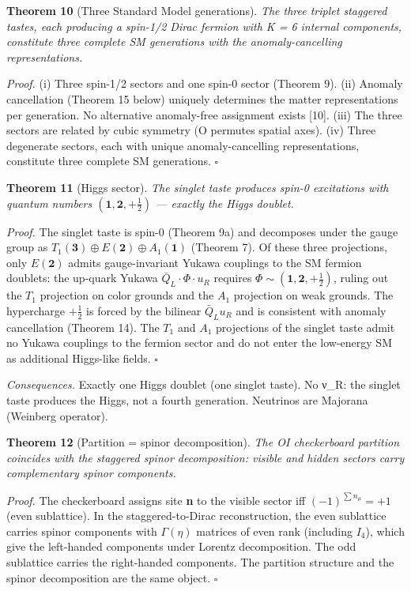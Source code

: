 \documentclass[
  11pt,
]{article}
\begin{document}
\textbf{Theorem 10} (Three Standard Model generations). \emph{The three
triplet staggered tastes, each producing a spin-1/2 Dirac fermion with K
= 6 internal components, constitute three complete SM generations with
the anomaly-cancelling representations.}

\emph{Proof.} (i) Three spin-1/2 sectors and one spin-0 sector (Theorem
9). (ii) Anomaly cancellation (Theorem 15 below) uniquely determines the
matter representations per generation. No alternative anomaly-free
assignment exists {[}10{]}. (iii) The three sectors are related by cubic
symmetry (O permutes spatial axes). (iv) Three degenerate sectors, each
with unique anomaly-cancelling representations, constitute three
complete SM generations. \(\square\)

\textbf{Theorem 11} (Higgs sector). \emph{The singlet taste produces
spin-0 excitations with quantum numbers
\((\mathbf{1}, \mathbf{2}, +\tfrac{1}{2})\) --- exactly the Higgs
doublet.}

\emph{Proof.} The singlet taste is spin-0 (Theorem 9a) and decomposes
under the gauge group as
\(T_1(\mathbf{3}) \oplus E(\mathbf{2}) \oplus A_1(\mathbf{1})\) (Theorem
7). Of these three projections, only \(E(\mathbf{2})\) admits
gauge-invariant Yukawa couplings to the SM fermion doublets: the
up-quark Yukawa \(\bar Q_L \cdot \Phi \cdot u_R\) requires
\(\Phi \sim (\mathbf{1}, \mathbf{2}, +\tfrac{1}{2})\), ruling out the
\(T_1\) projection on color grounds and the \(A_1\) projection on weak
grounds. The hypercharge \(+\tfrac{1}{2}\) is forced by the bilinear
\(\bar Q_L u_R\) and is consistent with anomaly cancellation (Theorem
14). The \(T_1\) and \(A_1\) projections of the singlet taste admit no
Yukawa couplings to the fermion sector and do not enter the low-energy
SM as additional Higgs-like fields. \(\square\)

\emph{Consequences.} Exactly one Higgs doublet (one singlet taste). No
ν\_R: the singlet taste produces the Higgs, not a fourth generation.
Neutrinos are Majorana (Weinberg operator).

\textbf{Theorem 12} (Partition = spinor decomposition). \emph{The OI
checkerboard partition coincides with the staggered spinor
decomposition: visible and hidden sectors carry complementary spinor
components.}

\emph{Proof.} The checkerboard assigns site \textbf{n} to the visible
sector iff \((-1)^{\sum n_\mu} = +1\) (even sublattice). In the
staggered-to-Dirac reconstruction, the even sublattice carries spinor
components with \(\Gamma(\eta)\) matrices of even rank (including
\(I_4\)), which give the left-handed components under Lorentz
decomposition. The odd sublattice carries the right-handed components.
The partition structure and the spinor decomposition are the same
object. \(\square\)
\end{document}
